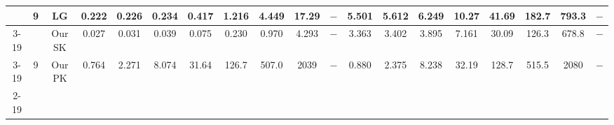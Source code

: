 \begin{table}[]
{\begin{tabular}{|c|c|c|cccccccccccccccc|}
& \multirow{3}{*}{9}  & LG & \multicolumn{1}{c|}{0.222} & \multicolumn{1}{c|}{0.226} & \multicolumn{1}{c|}{0.234} & \multicolumn{1}{c|}{0.417} & \multicolumn{1}{c|}{1.216} & \multicolumn{1}{c|}{4.449} & \multicolumn{1}{c|}{17.29} & \multicolumn{1}{c|}{$-$} & \multicolumn{1}{c|}{5.501} & \multicolumn{1}{c|}{5.612} & \multicolumn{1}{c|}{6.249} & \multicolumn{1}{c|}{10.27} & \multicolumn{1}{c|}{41.69} & \multicolumn{1}{c|}{182.7} & \multicolumn{1}{c|}{793.3} & $-$ \\ \cline{3-19} 
 &  & Our SK & \multicolumn{1}{c|}{\cellcolor{blue!30}0.027} & \multicolumn{1}{c|}{\cellcolor{blue!30}0.031} & \multicolumn{1}{c|}{\cellcolor{blue!30}0.039} & \multicolumn{1}{c|}{\cellcolor{blue!30}0.075} & \multicolumn{1}{c|}{\cellcolor{blue!30}0.230} & \multicolumn{1}{c|}{\cellcolor{blue!30}0.970} & \multicolumn{1}{c|}{\cellcolor{blue!30}4.293} & \multicolumn{1}{c|}{$-$} & \multicolumn{1}{c|}{3.363} & \multicolumn{1}{c|}{3.402} & \multicolumn{1}{c|}{\cellcolor{blue!30}3.895} & \multicolumn{1}{c|}{\cellcolor{blue!30}7.161} & \multicolumn{1}{c|}{\cellcolor{blue!30}30.09} & \multicolumn{1}{c|}{\cellcolor{blue!30}126.3} & \multicolumn{1}{c|}{\cellcolor{blue!30}678.8} & $-$ \\ \cline{3-19} 
 & \multirow{-3}{*}{9} & Our PK & \multicolumn{1}{c|}{0.764} & \multicolumn{1}{c|}{2.271} & \multicolumn{1}{c|}{8.074} & \multicolumn{1}{c|}{31.64} & \multicolumn{1}{c|}{126.7} & \multicolumn{1}{c|}{507.0} & \multicolumn{1}{c|}{2039} & \multicolumn{1}{c|}{$-$} & \multicolumn{1}{c|}{\cellcolor{blue!30}0.880} & \multicolumn{1}{c|}{\cellcolor{blue!30}2.375} & \multicolumn{1}{c|}{8.238} & \multicolumn{1}{c|}{32.19} & \multicolumn{1}{c|}{128.7} & \multicolumn{1}{c|}{515.5} & \multicolumn{1}{c|}{2080} & $-$ \\ \cline{2-19}  


\end{tabular}}
\end{table}
